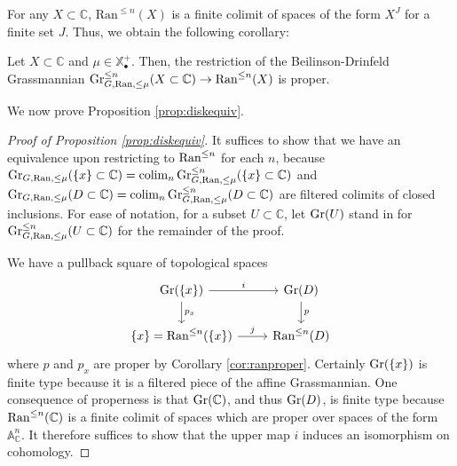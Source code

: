 For any $X\subset \mathbb{C}$, $\mathrm{Ran}^{\leq n}(X)$ is a finite colimit of spaces of the form $X^J$ for a finite set $J$.  Thus, we obtain the following corollary:

\begin{cor}\label{cor:ranproper}
Let $X\subset \mathbb{C}$ and $\mu \in \mathbb{X}_{\bullet}^+$.  Then, the restriction of the Beilinson-Drinfeld Grassmannian $\operatorname{\mathrm{Gr}}^{\leq n}_{G,\operatorname{\mathrm{Ran}},\leq \mu}(X\subset \mathbb{C}) \to \mathrm{Ran}^{\leq n}(X)$ is proper.
\end{cor}

We now prove Proposition \ref{prop:diskequiv}.  

\begin{proof}[Proof of Proposition \ref{prop:diskequiv}]
It suffices to show that we have an equivalence upon restricting to $\operatorname{\mathrm{Ran}}^{\leq n}$ for each $n$, because $\operatorname{\mathrm{Gr}}_{G, \operatorname{\mathrm{Ran}}, \leq  \mu}(\{ x\} \subset\mathbb{C}) = \operatorname*{\mathrm{colim}}_n \operatorname{\mathrm{Gr}}^{\leq n}_{G,\operatorname{\mathrm{Ran}}, \leq \mu}(\{x \} \subset \mathbb{C})$ and $\operatorname{\mathrm{Gr}}_{G, \operatorname{\mathrm{Ran}}, \leq  \mu}(D \subset\mathbb{C}) = \operatorname*{\mathrm{colim}}_n \operatorname{\mathrm{Gr}}^{\leq n}_{G,\operatorname{\mathrm{Ran}}, \leq \mu}(D \subset \mathbb{C})$ are filtered colimits of closed inclusions.  For ease of notation, for a subset $U\subset \mathbb{C}$, let $\operatorname{\mathrm{Gr}}(U)$ stand in for $\operatorname{\mathrm{Gr}}^{\leq n}_{G,\operatorname{\mathrm{Ran}}, \leq  \mu}(U \subset \mathbb{C})$ for the remainder of the proof.  

We have a pullback square of topological spaces 
\begin{equation*}
\begin{tikzcd}
\Gra (\{ x\}) \arrow[r,"i"]\arrow[d,"p_x"] & \Gra (D) \arrow[d,"p"]\\
\{x \} = \Ran^{\leq n}(\{ x\} )\arrow[r,"j"] & \Ran^{\leq n}(D)
\end{tikzcd} \end{equation*}
where $p$ and $p_x$ are proper by Corollary \ref{cor:ranproper}.  Certainly $\operatorname{\mathrm{Gr}}(\{ x\})$ is finite type because it is a filtered piece of the affine Grassmannian.  One consequence of properness is that $\operatorname{\mathrm{Gr}}(\mathbb{C})$, and thus $\operatorname{\mathrm{Gr}}(D)$, is finite type because $\operatorname{\mathrm{Ran}}^{\leq n}(\mathbb{C})$ is a finite colimit of spaces which are proper over spaces of the form $\mathbb{A}^n_{\mathbb{C}}$.  It therefore suffices to show that the upper map $i$ induces an isomorphism on cohomology.  


\end{proof}
